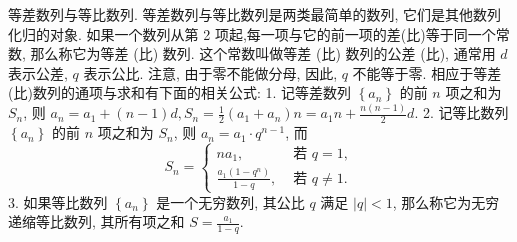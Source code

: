 
等差数列与等比数列.
等差数列与等比数列是两类最简单的数列, 它们是其他数列化归的对象.
如果一个数列从第 2 项起,每一项与它的前一项的差(比)等于同一个常数, 那么称它为等差 (比) 数列.
这个常数叫做等差 (比) 数列的公差 (比), 通常用 $d$ 表示公差, $q$ 表示公比.
注意, 由于零不能做分母, 因此, $q$ 不能等于零.
相应于等差 (比)数列的通项与求和有下面的相关公式:
1. 记等差数列 $\left\{a_n\right\}$ 的前 $n$ 项之和为 $S_n$, 则 $a_n=a_1+(n-1) d, S_n= \frac{1}{2}\left(a_1+a_n\right) n=a_1 n+\frac{n(n-1)}{2} d$.
2. 记等比数列 $\left\{a_n\right\}$ 的前 $n$ 项之和为 $S_n$, 则 $a_n=a_1 \cdot q^{n-1}$, 而
$$
S_n= \begin{cases}n a_1, & \text { 若 } q=1, \\ \frac{a_1\left(1-q^n\right)}{1-q}, & \text { 若 } q \neq 1 .\end{cases}
$$
3. 如果等比数列 $\left\{a_n\right\}$ 是一个无穷数列, 其公比 $q$ 满足 $|q|<1$, 那么称它为无穷递缩等比数列, 其所有项之和 $S=\frac{a_1}{1-q}$.



